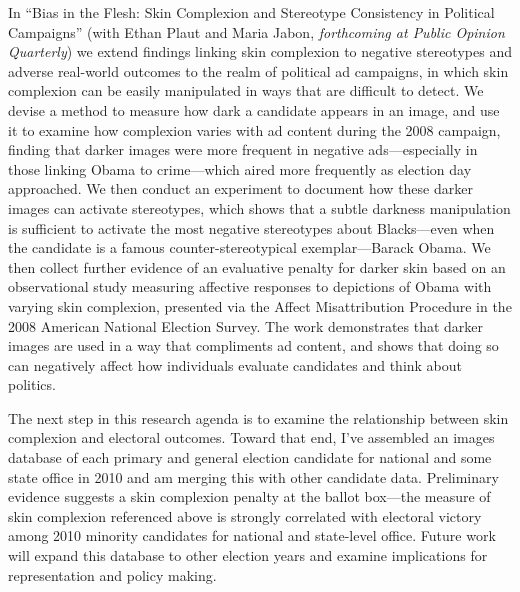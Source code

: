 \documentclass[12pt]{article}
\begin{document}
In ``Bias in the Flesh: Skin Complexion and Stereotype Consistency in Political Campaigns'' (with Ethan Plaut and Maria Jabon, \emph{forthcoming at Public Opinion Quarterly}) we extend findings linking skin complexion to negative stereotypes and adverse real-world outcomes to the realm of political ad campaigns, in which skin complexion can be easily manipulated in ways that are difficult to detect.  We devise a method to measure how dark a candidate appears in an image, and use it to examine how complexion varies with ad content during the 2008 campaign, finding that darker images were more frequent in negative ads---especially in those linking Obama to crime---which aired more frequently as election day approached.  We then conduct an experiment to document how these darker images can activate stereotypes, which shows that a subtle darkness manipulation is sufficient to activate the most negative stereotypes about Blacks---even when the candidate is a famous counter-stereotypical exemplar---Barack Obama.  We then collect further evidence of an evaluative penalty for darker skin based on an observational study measuring affective responses to depictions of Obama with varying skin complexion, presented via the Affect Misattribution Procedure in the 2008 American National Election Survey.  The work demonstrates that darker images are used in a way that compliments ad content, and shows that doing so can negatively affect how individuals evaluate candidates and think about politics.

The next step in this research agenda is to examine the relationship between skin complexion and electoral outcomes.  Toward that end, I've assembled an images database of each primary and general election candidate for national and some state office in 2010 and am merging this with other candidate data.  Preliminary evidence suggests a skin complexion penalty at the ballot box---the measure of skin complexion referenced above is strongly correlated with electoral victory among 2010 minority candidates for national and state-level office.  Future work will expand this database to other election years and examine implications for representation and policy making.  %
\end{document}
